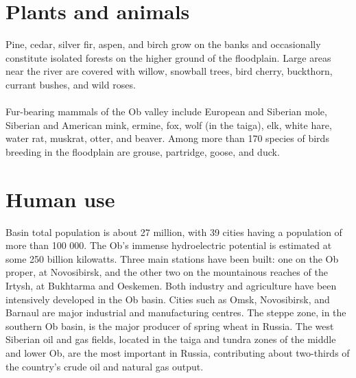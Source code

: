 \section{Plants and animals}
Pine, cedar, silver fir, aspen, and birch grow on the banks and occasionally constitute isolated forests on the higher ground of the floodplain. Large areas near the river are covered with willow, snowball trees, bird cherry, buckthorn, currant bushes, and wild roses.\\\\
Fur-bearing mammals of the Ob valley include European and Siberian mole, Siberian and American mink, ermine, fox, wolf (in the taiga), elk, white hare, water rat, muskrat, otter, and beaver. Among more than 170 species of birds breeding in the floodplain are grouse, partridge, goose, and duck.
\section{Human use}
Basin total population is about 27 million, with 39 cities having a population of more than 100 000. The Ob's immense hydroelectric potential is estimated at some 250 billion kilowatts. Three main stations have been built: one on the Ob proper, at Novosibirsk, and the other two on the mountainous reaches of the Irtysh, at Bukhtarma and Oeskemen. Both industry and agriculture have been intensively developed in the Ob basin. Cities such as Omsk, Novosibirsk, and Barnaul are major industrial and manufacturing centres. The steppe zone, in the southern Ob basin, is the major producer of spring wheat in Russia. The west Siberian oil and gas fields, located in the taiga and tundra zones of the middle and lower Ob, are the most important in Russia, contributing about two-thirds of the country's crude oil and natural gas output.